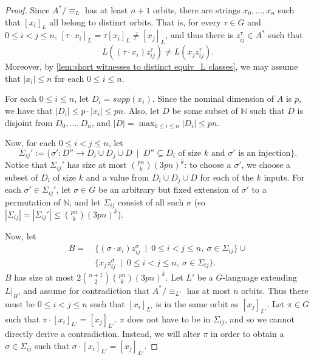 \documentclass[runningheads]{llncs}
\newcommand{\bb}{\mathbb}
\begin{document}
\begin{proof}
    Since $A^* / \equiv_L$ has at least $n+1$ orbits, there are strings $x_0, \ldots, x_n$ such that $[x_i]_{L}$ all belong to distinct orbits. 
    That is, for every $\tau \in G$ and $0 \leq i < j \leq n$, $[\tau \cdot x_i]_L = \tau [x_i]_L \neq [x_j]_L$, and thus there is $z^\tau_{ij} \in A^*$ such that 
    \[
        L((\tau \cdot x_i) z^\tau_{ij}) \neq L(x_j z^\tau_{ij}).
    \]
    Moreover, by \autoref{lem:short witnesses to distinct equiv_L classes}, we may assume that $|x_i| \leq n$ for each $0 \leq i \leq n$. 

    For each $0 \leq i \leq n$, let $D_i = supp(x_i)$. 
    Since the nominal dimension of $A$ is $p$, we have that $|D_i| \leq p \cdot |x_i| \leq pn$. 
    Also, let $D$ be some subset of $\bb N$ such that $D$ is disjoint from $D_0, \ldots, D_n$, and $\displaystyle |D| = \max_{0 \leq i \leq n} |D_i| \leq pn$.

    Now, for each $0 \leq i < j \leq n$, let
    \[
        \Sigma_{ij}' := \{\sigma' : D'' \to D_i \cup D_j \cup D \ \mid \ D'' \subseteq D_i \text{ of size } k \text{ and $\sigma'$ is an injection}\}.
    \]
    Notice that $\Sigma_{ij}'$ has size at most $\binom{pn}{k} (3pn)^k$: to choose a $\sigma'$, we choose a subset of $D_i$ of size $k$ and a value from $D_i \cup D_j \cup D$ for each of the $k$ inputs.
    For each $\sigma' \in \Sigma_{ij}'$, let $\sigma \in G$ be an arbitrary but fixed extension of $\sigma'$ to a permutation of $\bb N$, and let $\Sigma_{ij}$ consist of all such $\sigma$ (so $|\Sigma_{ij}| = |\Sigma_{ij}'| \leq \binom{pn}{k} (3pn)^k$). 

    Now, let 
    \begin{align*}
        B = \ &\{(\sigma \cdot x_i) z^\sigma_{ij} \ \mid \ 0 \leq i < j \leq n, \ \sigma \in \Sigma_{ij}\} \cup \\
        &\{x_j z^\sigma_{ij} \ \mid \ 0 \leq i < j \leq n, \ \sigma \in \Sigma_{ij}\}.
    \end{align*}
    $B$ has size at most $2 \binom{n+1}{2} \binom{pn}{k} (3pn)^k$. 
    Let $L'$ be a $G$-language extending $L|_B$, and assume for contradiction that $A^* / \equiv_{L'}$ has at most $n$ orbits. 
    Thus there must be $0 \leq i < j \leq n$ such that $[x_i]_{L'}$ is in the same orbit as $[x_j]_{L'}$. 
    Let $\pi \in G$ such that $\pi \cdot [x_i]_{L'} = [x_j]_{L'}$. 
    $\pi$ does not have to be in $\Sigma_{ij}$, and so we cannot directly derive a contradiction. 
    Instead, we will alter $\pi$ in order to obtain a $\sigma \in \Sigma_{ij}$ such that $\sigma \cdot [x_i]_{L'} = [x_j]_{L'}$.


\end{proof}
\end{document}
